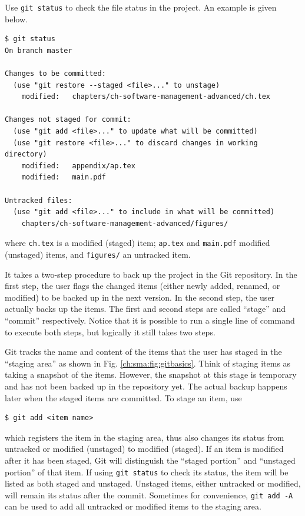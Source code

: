 Use \verb|git status| to check the file status in the project. An example is given below.
\begin{lstlisting}
$ git status
On branch master

Changes to be committed:
  (use "git restore --staged <file>..." to unstage)
	modified:   chapters/ch-software-management-advanced/ch.tex

Changes not staged for commit:
  (use "git add <file>..." to update what will be committed)
  (use "git restore <file>..." to discard changes in working directory)
	modified:   appendix/ap.tex
	modified:   main.pdf

Untracked files:
  (use "git add <file>..." to include in what will be committed)
	chapters/ch-software-management-advanced/figures/
\end{lstlisting}
where \verb|ch.tex| is a modified (staged) item; \verb|ap.tex| and \verb|main.pdf| modified (unstaged) items, and \verb|figures/| an untracked item.

It takes a two-step procedure to back up the project in the Git repository. In the first step, the user flags the changed items (either newly added, renamed, or modified) to be backed up in the next version. In the second step, the user actually backs up the items. The first and second steps are called ``stage'' and ``commit'' respectively. Notice that it is possible to run a single line of command to execute both steps, but logically it still takes two steps.

Git tracks the name and content of the items that the user has staged in the ``staging area'' as shown in Fig. \ref{ch:sma:fig:gitbasics}. Think of staging items as taking a snapshot of the items. However, the snapshot at this stage is temporary and has not been backed up in the repository yet. The actual backup happens later when the staged items are committed. To stage an item, use
\begin{lstlisting}
$ git add <item name>
\end{lstlisting}
which registers the item in the staging area, thus also changes its status from untracked or modified (unstaged) to modified (staged). If an item is modified after it has been staged, Git will distinguish the ``staged portion'' and ``unstaged portion'' of that item. If using \verb|git status| to check its status, the item will be listed as both staged and unstaged. Unstaged items, either untracked or modified, will remain its status after the commit. Sometimes for convenience, \verb|git add -A| can be used to add all untracked or modified items to the staging area.

